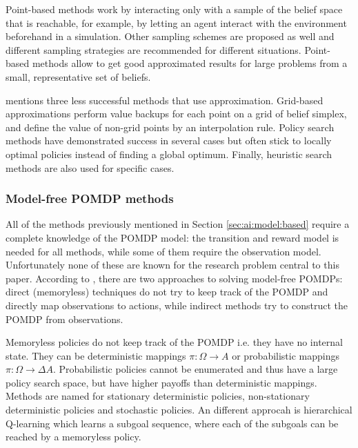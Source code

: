 Point-based methods work by interacting only with a sample of the belief space
that is reachable, for example, by letting an agent interact with the
environment beforehand in a simulation. Other sampling schemes are proposed as
well and different sampling strategies are recommended for different
situations. Point-based methods allow to get good approximated results for
large problems from a small, representative set of beliefs.
\parencite{Spaan2012ai+pomdp}

\textcite{Spaan2012ai+pomdp} mentions three less successful methods that use
approximation. Grid-based approximations perform value backups for each point
on a grid of belief simplex, and define the value of non-grid points by an
interpolation rule. Policy search methods have demonstrated success in several
cases but often stick to locally optimal policies instead of finding a global
optimum. Finally, heuristic search methods are also used for specific cases.


\subsubsection{Model-free POMDP methods}
\label{sec:ai:model:free}

All of the methods previously mentioned in Section \ref{sec:ai:model:based}
require a complete knowledge of the POMDP model: the transition and reward
model is needed for all methods, while some of them require the observation
model. Unfortunately none of these are known for the research problem central
to this paper. According to \textcite{Spaan2012ai+pomdp}, there are two
approaches to solving model-free POMDPs: direct (memoryless) techniques do not
try to keep track of the POMDP and directly map observations to actions, while
indirect methods try to construct the POMDP from observations.

Memoryless policies do not keep track of the POMDP i.e. they have no internal
state. They can be deterministic mappings \(\pi : \Omega \rightarrow A \) or
probabilistic mappings \(\pi : \Omega \rightarrow \Delta A \). Probabilistic
policies cannot be enumerated and thus have a large policy search space, but
have higher payoffs than deterministic mappings. Methods are named for
stationary deterministic policies, non-stationary deterministic policies and
stochastic policies. An different approcah is hierarchical Q-learning which
learns a subgoal sequence, where each of the subgoals can be reached by a
memoryless policy. \parencite{Spaan2012ai+pomdp}

